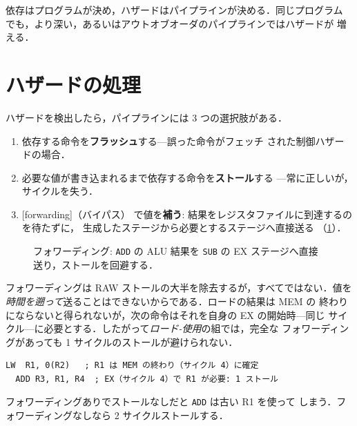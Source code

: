 \documentclass[../main.tex]{subfiles}
\begin{document}
\begin{keypoint}
  依存はプログラムが決め，ハザードはパイプラインが決める．同じプログラム
  でも，より深い，あるいはアウトオブオーダのパイプラインではハザードが
  増える．
\end{keypoint}

\section{ハザードの処理}

ハザードを検出したら，パイプラインには 3 つの選択肢がある．

\begin{enumerate}
  \item 依存する命令を\textbf{フラッシュ}する---誤った命令がフェッチ
    された制御ハザードの場合．
  \item 必要な値が書き込まれるまで依存する命令を\textbf{ストール}する
    ---常に正しいが，サイクルを失う．
  \item {}[forwarding]（バイパス）
    で値を\textbf{補う}: 結果をレジスタファイルに到達するのを待たずに，
    生成したステージから必要とするステージへ直接送る
    （\cref{fig:forwarding}）．
\end{enumerate}

\begin{figure}[htbp]
  \centering
  
  \caption{フォワーディング: \texttt{ADD} の ALU 結果を \texttt{SUB} の
    EX ステージへ直接送り，ストールを回避する．}
  \label{fig:forwarding}
\end{figure}

フォワーディングは RAW ストールの大半を除去するが，すべてではない．値を
\emph{時間を遡って}送ることはできないからである．ロードの結果は MEM の
終わりにならないと得られないが，次の命令はそれを自身の EX の開始時---同じ
サイクル---に必要とする．したがって\emph{ロード-使用}の組では，完全な
フォワーディングがあっても 1 サイクルのストールが避けられない．

\begin{example}\leavevmode %
  \begin{lstlisting}[language={[x86masm]Assembler}, numbers=none]
  LW  R1, 0(R2)   ; R1 は MEM の終わり（サイクル 4）に確定
  ADD R3, R1, R4  ; EX（サイクル 4）で R1 が必要: 1 ストール
\end{lstlisting}
  フォワーディングありでストールなしだと \texttt{ADD} は古い R1 を使って
  しまう．フォワーディングなしなら 2 サイクルストールする．
\end{example}
\end{document}

